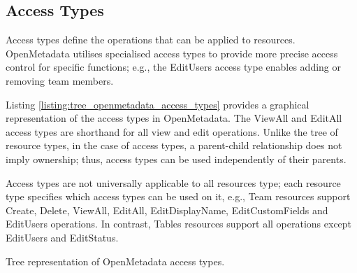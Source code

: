 \subsection{Access Types}

Access types define the operations that can be applied to resources. OpenMetadata utilises specialised access types to provide more precise access control for specific functions; e.g., the EditUsers access type enables adding or removing team members. 

Listing \ref{listing:tree_openmetadata_access_types} provides a graphical representation of the access types in OpenMetadata. The ViewAll and EditAll access types are shorthand for all view and edit operations. Unlike the tree of resource types, in the case of access types, a parent-child relationship does not imply ownership; thus, access types can be used independently of their parents.

Access types are not universally applicable to all resources type; each resource type specifies which access types can be used on it, e.g., Team resources support Create, Delete, ViewAll, EditAll, EditDisplayName, EditCustomFields and EditUsers operations. In contrast, Tables resources support all operations except EditUsers and EditStatus.

\begin{listing}

    \renewcommand\DTstyle{\rmfamily}

    \caption{Tree representation of OpenMetadata access types.}
    \label{listing:tree_openmetadata_access_types}
    
\end{listing}